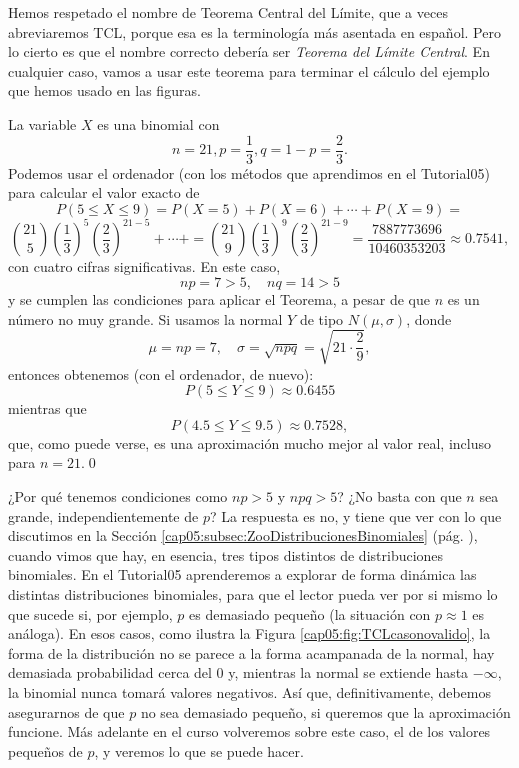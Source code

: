 Hemos respetado el nombre de Teorema Central del Límite, que a veces abreviaremos TCL, porque esa es la terminología más asentada en español. Pero lo cierto es que el nombre correcto debería ser {\em Teorema del Límite Central}. En cualquier caso, vamos a usar este teorema para terminar el cálculo del ejemplo que hemos usado en las figuras.
\begin{ejemplo}
\label{cap05:ejem:CorreccionContinuidad}
La variable $X$ es una binomial con
\[n=21, p=\dfrac{1}{3}, q=1-p=\dfrac{2}{3}.\]
Podemos usar el ordenador (con los métodos que aprendimos en el Tutorial05) para calcular el valor exacto de
\[P(5\leq X\leq 9)=P(X=5)+P(X=6)+\cdots+P(X=9)=\]\[
\binom{21}{5}\left(\dfrac{1}{3}\right)^5\left(\dfrac{2}{3}\right)^{21-5}+\cdots+
=\binom{21}{9}\left(\dfrac{1}{3}\right)^9\left(\dfrac{2}{3}\right)^{21-9}=\frac{7887773696}{10460353203}\approx 0.7541,\]
con cuatro cifras significativas. En este caso,
\[n p=7 > 5,\quad n q = 14 > 5\]
y se cumplen las condiciones para aplicar el Teorema, a pesar de que $n$ es un número no muy grande.
Si usamos la normal $Y$ de tipo $N(\mu,\sigma)$, donde
\[\mu=n p=7,\quad \sigma=\sqrt{n p q}=\sqrt{21\cdot\dfrac{2}{9}},\]
entonces obtenemos (con el ordenador, de nuevo):
\[P(5\leq Y\leq 9)\approx 0.6455\]
mientras que
\[P(4.5\leq Y\leq 9.5)\approx 0.7528,\]
que, como puede verse, es una aproximación mucho mejor al valor real, incluso para $n=21$.\qed
\end{ejemplo}

¿Por qué tenemos condiciones como $np>5$ y $npq>5$? ¿No basta con que $n$ sea grande, independientemente de $p$? La respuesta es no, y tiene que ver con lo que discutimos en la Sección \ref{cap05:subsec:ZooDistribucionesBinomiales} (pág. \pageref{cap05:subsec:ZooDistribucionesBinomiales}), cuando vimos que hay, en esencia, tres tipos distintos de distribuciones binomiales. En el Tutorial05 aprenderemos a explorar de forma dinámica las distintas distribuciones binomiales, para que el lector pueda ver por si mismo lo que sucede si, por ejemplo, $p$ es demasiado pequeño (la situación con $p\approx 1$ es análoga). En esos casos, como ilustra la Figura \ref{cap05:fig:TCLcasonovalido}, la forma de  la distribución no se parece a la forma acampanada de la normal, hay demasiada probabilidad cerca del 0 y, mientras la normal se extiende hasta $-\infty$, la binomial nunca tomará valores negativos. Así que, definitivamente, debemos asegurarnos de que $p$ no sea demasiado pequeño, si queremos que la aproximación funcione. Más adelante en el curso volveremos sobre este caso, el de los valores pequeños de $p$, y veremos lo que se puede hacer.

